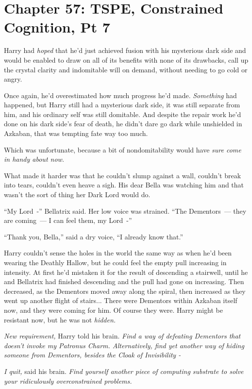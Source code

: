 \chapter{Chapter 57: TSPE, Constrained Cognition, Pt 7}
Harry had \emph{hoped} that he'd just achieved fusion with his mysterious dark side and would be enabled to draw on all of its benefits with none of its drawbacks, call up the crystal clarity and indomitable will on demand, without needing to go cold or angry.

Once again, he'd overestimated how much progress he'd made. \emph{Something} had happened, but Harry still had a mysterious dark side, it was still separate from him, and his ordinary self was still domitable. And despite the repair work he'd done on his dark side's fear of death, he didn't dare go dark while unshielded in Azkaban, that was tempting fate way too much.

Which was unfortunate, because a bit of nondomitability would have \emph{sure come in handy about now.}

What made it harder was that he couldn't slump against a wall, couldn't break into tears, couldn't even heave a sigh. His dear Bella was watching him and that wasn't the sort of thing her Dark Lord would do.

``My Lord~-'' Bellatrix said. Her low voice was strained. ``The Dementors~--- they are coming~--- I can feel them, my Lord~-''

``Thank you, Bella,'' said a dry voice, ``I already know that.''

Harry couldn't sense the holes in the world the same way as when he'd been wearing the Deathly Hallow, but he could feel the empty pull increasing in intensity. At first he'd mistaken it for the result of descending a stairwell, until he and Bellatrix had finished descending and the pull had gone on increasing. Then decreased, as the Dementors moved away along the spiral, then increased as they went up another flight of stairs... There were Dementors within Azkaban itself now, and they were coming for him. Of course they were. Harry might be resistant now, but he was not \emph{hidden.}

\emph{New requirement,} Harry told his brain. \emph{Find a way of defeating Dementors that doesn't invoke my Patronus Charm. Alternatively, find yet another way of hiding someone from Dementors, besides the Cloak of Invisibility -}

\emph{I quit,} said his brain. \emph{Find yourself another piece of computing substrate to solve your ridiculously overconstrained problems.}

